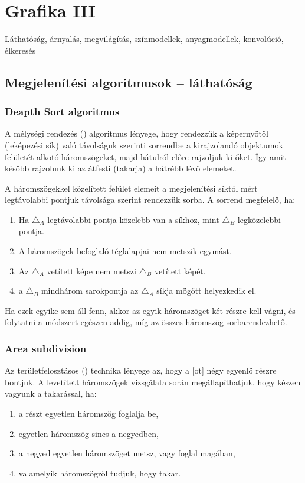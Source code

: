 \documentclass[../../main.tex]{subfiles}
\begin{document}
\section{Grafika III}

\begin{fulltheorem}
  Láthatóság, árnyalás, megvilágítás, színmodellek, anyagmodellek, konvolúció, élkeresés
\end{fulltheorem}

\subsection{Megjelenítési algoritmusok -- láthatóság}

\subsubsection{Deapth Sort algoritmus}

A mélységi rendezés () algoritmus lényege, hogy rendezzük a
képernyőtől (leképezési sík) való távolságuk szerinti sorrendbe a kirajzolandó
objektumok felületét alkotó háromszögeket, majd hátulról előre rajzoljuk
ki őket. Így amit később rajzolunk ki az átfesti (takarja) a hátrébb lévő elemeket.

A háromszögekkel közelített felület elemeit a megjelenítési síktól mért
legtávolabbi pontjuk távolsága szerint rendezzük sorba. A sorrend megfelelő, ha:
\begin{enumerate}
  \item Ha $\triangle_A$ legtávolabbi pontja közelebb van a síkhoz, mint
        $\triangle_B$ legközelebbi pontja.
  \item A háromszögek befoglaló téglalapjai nem metszik egymást.
  \item Az $\triangle_A$ vetített képe nem metszi $\triangle_B$ vetített képét.
  \item a $\triangle_B$ mindhárom sarokpontja az $\triangle_A$ síkja mögött
        helyezkedik el.
\end{enumerate}
Ha ezek egyike sem áll fenn, akkor az egyik háromszöget két részre kell vágni,
és folytatni a módszert egészen addig, míg az összes háromszög sorbarendezhető.

\subsubsection{Area subdivision}

Az területfelosztásos () technika lényege az, hogy a
[ot] négy egyenlő részre bontjuk. A levetített háromszögek
vizsgálata során megállapíthatjuk, hogy készen vagyunk a takarással, ha:
\begin{enumerate}
  \item a részt egyetlen háromszög foglalja be,
  \item egyetlen háromszög sincs a negyedben,
  \item a negyed egyetlen háromszöget metsz, vagy foglal magában,
  \item valamelyik háromszögről tudjuk, hogy takar.
\end{enumerate}
\end{document}
